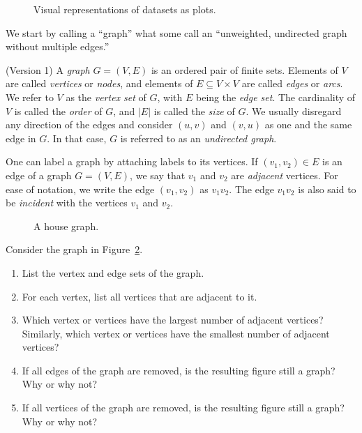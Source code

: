 \begin{figure}[!htbp]
\centering

\caption{Visual representations of datasets as plots.}
\label{fig:introduction:graphs_as_plots}
\end{figure}

We start by calling a ``graph'' what some call an
``unweighted,
undirected graph without
multiple edges.''

\begin{definition}
(Version 1)
{\rm
A \emph{graph} $G = (V, E)$ is an ordered pair of finite
sets. Elements of $V$ are called \emph{vertices} or
\emph{nodes}, and elements of $E \subseteq V \times V$ are
called \emph{edges} or \emph{arcs}. We refer
to $V$ as the \emph{vertex set} of $G$, with $E$
being the \emph{edge set}. The cardinality of $V$ is
called the \emph{order} of $G$, and $|E|$ is called the
\emph{size} of $G$. We usually disregard any direction of
the edges and consider $(u,v)$ and $(v,u)$ as one and the same edge in
$G$. In that case, $G$ is referred to as an
\emph{undirected graph}.
}
\end{definition}

One can label a graph by attaching labels to its vertices.
If $(v_1, v_2) \in E$ is an edge of a graph $G = (V, E)$, we say that $v_1$ and
$v_2$ are \emph{adjacent} vertices. For ease of notation, we write the
edge $(v_1, v_2)$ as $v_1 v_2$. The edge $v_1 v_2$ is also said to be
\emph{incident} with the vertices $v_1$ and $v_2$.

\begin{figure}[!htbp]
\centering

\caption{A house graph.}
\label{fig:introduction:house_graph}
\end{figure}

\begin{example}
\label{eg:introduction:house_graph}
Consider the graph in Figure~\ref{fig:introduction:house_graph}.
%
\begin{enumerate}
\item List the vertex and edge sets of the graph.

\item For each vertex, list all vertices that are adjacent to it.

\item Which vertex or vertices have the largest number of adjacent
  vertices? Similarly, which vertex or vertices have the smallest
  number of adjacent vertices?

\item If all edges of the graph are removed, is the resulting figure
  still a graph? Why or why not?

\item If all vertices of the graph are removed, is the resulting
  figure still a graph? Why or why not?
\end{enumerate}
\end{example}

